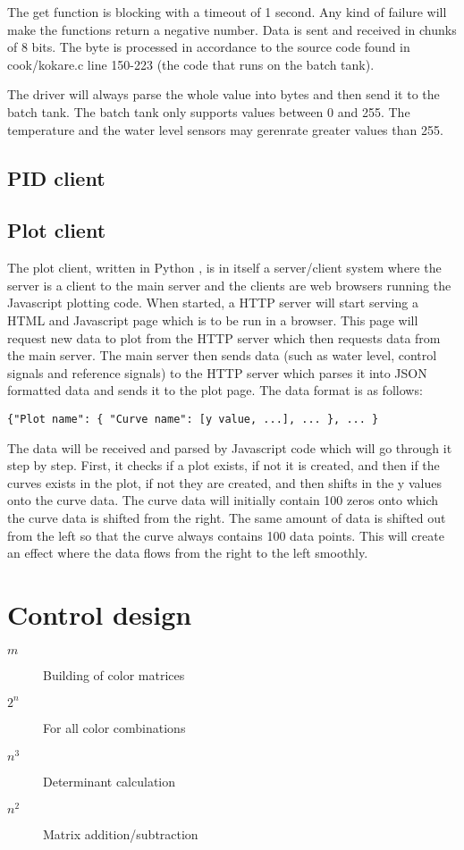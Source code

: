 \documentclass{article}
\begin{document}
The get function is blocking with a timeout of 1 second. Any kind of failure will make the functions return a negative number. Data is sent and received in chunks of 8 bits. The byte is processed in accordance to the source code found in cook/kokare.c line 150-223\cite{kokare.c} (the code that runs on the batch tank). 

The driver will always parse the whole value into bytes and then send it to the batch tank. The batch tank only supports values between 0 and 255. The temperature and the water level sensors may gerenrate greater values than 255. 

\subsection{PID client}

\subsection{Plot client}
The plot client, written in Python \cite{python}, is in itself a server/client system where the server is a client to the main server and the clients are web browsers running the Javascript plotting code. When started, a HTTP server will start serving a HTML and Javascript page which is to be run in a browser. This page will request new data to plot from the HTTP server which then requests data from the main server. The main server then sends data (such as water level, control signals and reference signals) to the HTTP server which parses it into JSON \cite{json} formatted data and sends it to the plot page. The data format is as follows:
\begin{verbatim}
{"Plot name": { "Curve name": [y value, ...], ... }, ... }
\end{verbatim}
The data will be received and parsed by Javascript code which will go through it step by step. First, it checks if a plot exists, if not it is created, and then if the curves exists in the plot, if not they are created, and then shifts in the y values onto the curve data. The curve data will initially contain 100 zeros onto which the curve data is shifted from the right. The same amount of data is shifted out from the left so that the curve always contains 100 data points. This will create an effect where the data flows from the right to the left smoothly.

\section{Control design}
\begin{description}
\item[$m$] Building of color matrices
\item[$2^n$] For all color combinations
\item[$n^3$] Determinant calculation
\item[$n^2$] Matrix addition/subtraction
\end{description}
\end{document}
